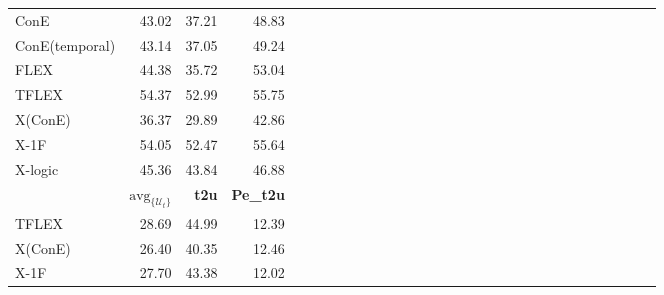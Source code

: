 \begin{table*}
{\begin{tabular}{lrrrrrrrrrrrrrrrrrrrrrrrrrrrrr }
      ConE           & 43.02                            & 37.21            & 48.83                                                                                                                                      \\
      ConE(temporal) & 43.14&  37.05&  49.24\\
      FLEX           & 44.38                            & 35.72            & 53.04                                                                                                                                      \\
      TFLEX          & 54.37                            & 52.99            & 55.75                                                                                                                                      \\
      X(ConE)        & 36.37                            & 29.89            & 42.86                                                                                                                                      \\
      X-1F           & 54.05                            & 52.47            & 55.64                                                                                                                                      \\
      X-logic        & 45.36                            & 43.84            & 46.88                                                                                                                                      \\
      \midrule
      \midrule
                     & $\text{avg}_{\{\mathcal{U}_t\}}$ & \textbf{t2u}     & \textbf{Pe\_t2u}                                                                                                                           \\
      \midrule
      TFLEX          & 28.69                            & 44.99            & 12.39                                                                                                                                      \\
      X(ConE)        & 26.40                            & 40.35            & 12.46                                                                                                                                      \\
      X-1F           & 27.70                            & 43.38            & 12.02                                                                                                                                      \\

\end{tabular}}
\end{table*}
